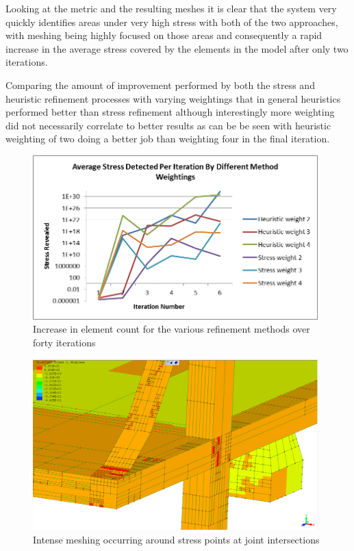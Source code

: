Looking at the metric and the resulting meshes it is clear that the system very quickly identifies areas under very high stress with both of the two approaches, with meshing being highly focused on those areas and consequently a rapid increase in the average stress covered by the elements in the model after only two iterations. 


\noindent
Comparing the amount of improvement performed by both the stress and heuristic refinement processes with varying weightings that in general heuristics performed better than stress refinement although interestingly more weighting did not necessarily correlate to better results as can be be seen with heuristic weighting of two doing a better job than weighting four in the final iteration. \\


\begin{figure}[!h]
  \centerline{\includegraphics[width=110mm, scale=1]{../Graphics/Graphs/AverageStressDetected Per Iteration By Different Method Weightings.png}}
  \caption{Increase in element count for the various refinement methods over forty iterations}
  \label{fig:sub1}
\end{figure}



\begin{figure}[!h]
  \centerline{\includegraphics[width=110mm, scale=1]{../Graphics/BridgeCrossLoadingStress/BridgeCrossLoadingStress6-3-2.png}}
  \caption{Intense meshing occurring around stress points at joint intersections}
  \label{fig:sub1}
\end{figure}


